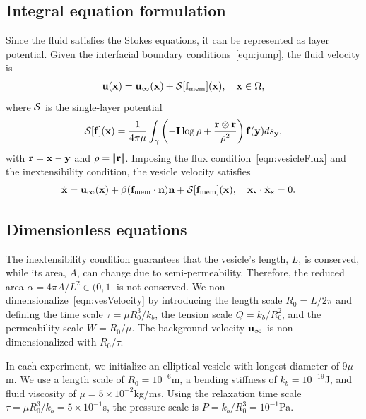 \documentclass[9pt,twocolumn,twoside,lineno]{pnas-new}
\begin{document}
\subsection*{Integral equation formulation}
Since the fluid satisfies the Stokes equations, it can be represented as
layer potential. Given the interfacial boundary
conditions~\eqref{eqn:jump}, the fluid velocity is
\begin{align}
  \mathbf{u}(\mathbf{x}) = \mathbf{u}_\infty(\mathbf{x}) + \mathcal{S}[\mathbf{f}_\mathrm{mem}](\mathbf{x}), \quad
    \mathbf{x} \in \Omega,
\end{align}
where $\mathcal{S}$ is the single-layer potential
\begin{align}
  \mathcal{S}[\mathbf{f}](\mathbf{x}) = \frac{1}{4\pi\mu} \int_{\gamma} \left(
    -\mathbf{I} \log\rho + \frac{\mathbf{r} \otimes \mathbf{r}}{\rho^2} \right)
    \mathbf{f}(\mathbf{y}) ds_{\mathbf{y}},
\end{align}
with $\mathbf{r} = \mathbf{x} - \mathbf{y}$ and $\rho = |\!| \mathbf{r} |\!|$. Imposing the flux
condition~\eqref{eqn:vesicleFlux} and the inextensibility condition, the
vesicle velocity satisfies
\begin{align}
  \label{eqn:vesVelocity}
  \dot{\mathbf{x}} &= \mathbf{u}_\infty(\mathbf{x}) + \beta (\mathbf{f}_\mathrm{mem}\cdot\mathbf{n})\mathbf{n}
  + \mathcal{S} [\mathbf{f}_\mathrm{mem}](\mathbf{x}),  \quad
  \mathbf{x}_s \cdot \dot{\mathbf{x}}_s = 0.
\end{align}

\subsection*{Dimensionless equations}
The inextensibility condition guarantees that the vesicle's length, $L$,
is conserved, while its area, $A$, can change due to semi-permeability.
Therefore, the reduced area $\alpha = 4\pi A/L^2 \in (0,1]$ is not
conserved. We non-dimensionalize~\eqref{eqn:vesVelocity} by introducing
the length scale $R_0 = L/2\pi$ and defining the time scale $\tau = \mu
R_0^3/k_b$, the tension scale $Q = k_b/R_0^2$, and the permeability
scale $W = R_0/\mu$. The background velocity $\mathbf{u}_\infty$ is
non-dimensionalized with $R_0/\tau$.

In each experiment, we initialize an elliptical vesicle with longest
diameter of 9$\mu$m. We use a length scale of $R_0 = 10^{-6}$m, a
bending stiffness of $k_b = 10^{-19}$J, and fluid viscosity of $\mu=5
\times 10^{-2}$kg/ms. Using the relaxation time scale $\tau = \mu
R_0^3/k_b = 5 \times 10^{-1}$s, the pressure scale is $P = k_b/R_0^3 =
10^{-1}$Pa. 
\end{document}
